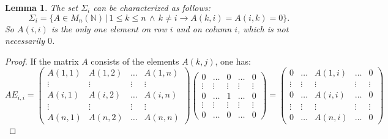 \documentclass{article}
\theoremstyle{plain}
\newtheorem{lemma}{Lemma}[section]
\theoremstyle{definition}
\begin{document}
\begin{lemma}\label{lemmasigmai}
The set $\Sigma_i$ can be characterized as follows:
$$\Sigma_i = \{ A \in M_n(\mathbb N) \,|\,1 \leq k \leq n \,\wedge \, k \neq i \rightarrow A(k,i) = A(i,k) = 0 \}.$$ 
So $A(i,i)$ is the only one element on row $i$ and on column $i$, which is not necessarily $0$. 
\end{lemma}

\begin{proof} If the matrix $A$ consists of the elements $A(k,j)$, one has:
$$ A E_{i,i} = 
\begin{pmatrix}
A(1,1) & A(1,2) & \dots & A(1,n) \\
\vdots & \vdots & \vdots & \vdots \\
A(i,1) & A(i,2) & \dots & A(i,n) \\
\vdots & \vdots & \vdots & \vdots \\
A(n,1) & A(n,2) & \dots & A(n,n) 
\end{pmatrix}
\begin{pmatrix}
0 & \dots & 0 & \dots & 0\\
\vdots & \vdots & \vdots & \vdots & \vdots \\
0 & \dots &1 & \dots & 0\\
\vdots & \vdots & \vdots & \vdots & \vdots \\
0 & \dots & 0 & \dots & 0
\end{pmatrix} = 
\begin{pmatrix}
0 & \dots & A(1,i) & \dots & 0\\
\vdots & \vdots & \vdots & \vdots & \vdots\\
0 & \dots &A(i,i) & \dots & 0\\
\vdots & \vdots & \vdots & \vdots & \vdots \\
0 & \dots & A(n,i) & \dots & 0
\end{pmatrix}
$$


\end{proof}
\end{document}
